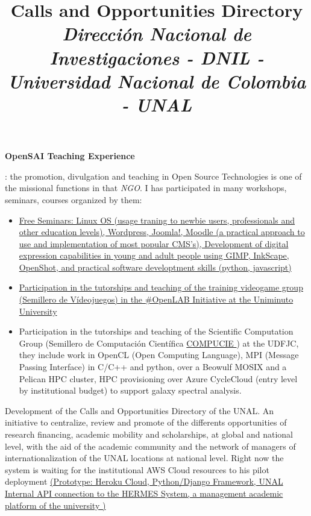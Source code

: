 \documentclass[overlapped,line,final]{res}
\begin{document}
\begin{resume}
\begin{position}
\begin{itemize}
	\end{itemize}
\newpage
\opening
\textbf{OpenSAI Teaching Experience}: the promotion, divulgation and teaching in Open Source Technologies is one of the missional functions in that \textit{NGO}. I has participated in many workshops, seminars, courses organized by them:
\begin{itemize}
	\item \href{https://opensai.org/tags/talleres}{Free Seminars: Linux OS (usage traning to newbie users, professionals and other education levels), Wordpress, Joomla!, Moodle (a practical approach to use and implementation of most popular CMS's), Development of digital expression capabilities in young and adult people using GIMP, InkScape, OpenShot, and practical software developtment skills (python, javascript) {}}
	\item \href{https://opensai.org/tags/videojuegos}{Participation in the tutorships and teaching of the training videogame group (Semillero de Vídeojuegos) in the \#OpenLAB Initiative at the Uniminuto University }
	\item Participation in the tutorships and teaching of the Scientific Computation Group (Semillero de Computación Científica  \href{http://chronos.udistrital.edu.co:8095/siciud/web/Consultas.x?accion=5&idSemillero=2382}{COMPUCIE } ) at the UDFJC, they include work in OpenCL (Open Computing Language), MPI (Message Passing Interface) in C/C++ and python, over a Beowulf MOSIX and a Pelican HPC cluster, HPC provisioning over Azure CycleCloud (entry level by institutional budget) to support galaxy spectral analysis.
	\end{itemize}
\end{position}

\title{\bf Calls and Opportunities Directory
		\newline \em Dirección Nacional de Investigaciones - DNIL - Universidad Nacional de Colombia - UNAL
}
\begin{position}
	Development of the Calls and Opportunities Directory of the UNAL. An initiative to centralize, review and promote of the differents opportunities of research financing, academic mobility and scholarships, at global and national level, with the aid of the academic community and the network of managers of internationalization of the UNAL locations at national level. Right now the system is waiting for the institutional AWS Cloud resources to his pilot deployment \href{https://unal-dnil.herokuapp.com/}{(Prototype: Heroku Cloud, Python/Django Framework, UNAL Internal API connection to the HERMES System, a management academic platform of the university )}
\end{position}


\end{resume}
\end{document}
